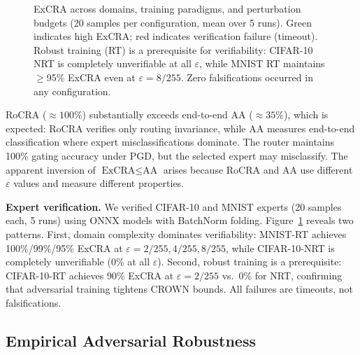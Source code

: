 \documentclass[runningheads]{llncs}
\begin{document}
\begin{figure}[!t]
\caption{ExCRA across domains, training paradigms, and perturbation budgets (20 samples per configuration, mean over 5 runs). Green indicates high ExCRA; red indicates verification failure (timeout). Robust training (RT) is a prerequisite for verifiability: CIFAR-10 NRT is completely unverifiable at all $\varepsilon$, while MNIST RT maintains $\geq$95\% ExCRA even at $\varepsilon = 8/255$. Zero falsifications occurred in any configuration.}
\label{fig:expert-heatmap}
\end{figure}

RoCRA ($\approx 100\%$) substantially exceeds end-to-end AA ($\approx 35\%$), which is expected: RoCRA verifies only routing invariance, while AA measures end-to-end classification where expert misclassifications dominate. The router maintains 100\% gating accuracy under PGD, but the selected expert may misclassify. The apparent inversion of $\text{ExCRA} \leq \text{AA}$ arises because RoCRA and AA use different $\varepsilon$ values and measure different properties.

\textbf{Expert verification.}
We verified CIFAR-10 and MNIST experts (20 samples each, 5 runs) using ONNX models with BatchNorm folding. Figure~\ref{fig:expert-heatmap} reveals two patterns. First, domain complexity dominates verifiability: MNIST-RT achieves 100\%/99\%/95\% ExCRA at $\varepsilon = 2/255, 4/255, 8/255$, while CIFAR-10-NRT is completely unverifiable (0\% at all $\varepsilon$). Second, robust training is a prerequisite: CIFAR-10-RT achieves 90\% ExCRA at $\varepsilon = 2/255$ vs.\ 0\% for NRT, confirming that adversarial training tightens CROWN bounds. All failures are timeouts, not falsifications.


\subsection{Empirical Adversarial Robustness}
\label{sec:eval-empirical}
\end{document}
